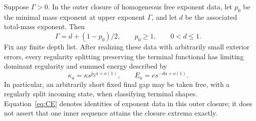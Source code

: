\begin{proposition}\label{rt:saturation}
Suppose $\Gamma>0$.  In the outer closure of homogeneous free exponent
data, let $p_0$ be the minimal mass exponent at upper exponent $\Gamma$,
and let $d$ be the associated total-mass exponent.  Then
\[
 \Gamma=d+(1-p_0)/2,\qquad p_0\ge1,\qquad 0<d\le1.
\]
Fix any finite depth list.  After realizing these data with arbitrarily
small exterior errors, every regularity splitting preserving the
terminal functional has limiting dominant regularity and summed energy
described by
\begin{equation}
 \kappa_a=\kappa s^{p_0a+o(1)},\qquad E_a=e s^{-da+o(1)}.
 \tag{CE}\label{eq:CE}
\end{equation}
In particular, an arbitrarily short fixed final gap may be taken free,
with a regularly split incoming state, when classifying terminal shapes.
Equation~\eqref{eq:CE} denotes identities of exponent data in this
outer closure; it does not assert that one inner sequence attains the
closure extrema exactly.
\end{proposition}

